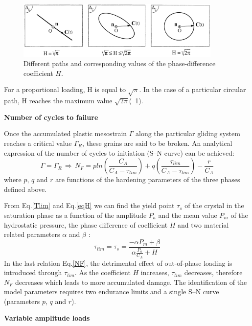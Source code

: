 \documentclass[3p,times,procedia,number]{elsarticle}
\newcommand{\figref}[1]{\figurename~\ref{#1}}
\begin{document}
\begin{figure}[h!]
	\centering
	\includegraphics[width=0.9\textwidth]{figures//H.png} 
	\caption{Different paths and corresponding values of the phase-difference coefficient $H$.}
	\label{figH}
\end{figure}
For a proportional
loading, H is equal to $\sqrt{\pi}$. In the case of a particular
circular path, H reaches the maximum value $\sqrt{2\pi}$(\figref{figH}). 


\textbf{Number of cycles to failure}

Once the accumulated plastic mesostrain $\Gamma$ along the particular gliding
system reaches a critical value $\Gamma_R$, these grains are said
to be broken. An analytical expression of the number
of cycles to initiation (S–N curve) can be achieved:
\begin{equation}
\Gamma=\Gamma_R \, \Rightarrow \, N_F=pln\left(\frac{C_A}{C_A-\tau_{lim}}\right)+q\left(\frac{\tau_{lim}}{C_A-\tau_{lim}}\right)-\frac{r}{C_A}
\label{NF}
\end{equation}
where $p$, $q$ and $r$ are functions of the hardening parameters of the three phases defined above.

From Eq.\eqref{Tlim} and Eq.\eqref{eqH} we can find the yield point $\tau_s$ of the crystal in the saturation phase as a function of the amplitude $P_a$ and the mean value $P_m$ of the hydrostatic pressure, the phase difference of coefficient $H$ and two material related parameters $\alpha$ and $\beta$ :
\begin{equation}
\tau_{lim}=\tau_s=\frac{-\alpha P_m+\beta}{\alpha\frac{P_a}{C_A}+H}
\label{taus}
\end{equation}
In the last relation Eq.\eqref{NF}, the detrimental effect of out-of-phase loading is introduced through $\tau_{lim}$. As the coefficient $H$ increases, $\tau_{lim}$  decreases, therefore $N_F$ decreases which leads to more accumulated damage. The identification of the model parameters requires two endurance limits and a
single S–N curve (parameters $p$, $q$ and $r$).



\textbf{Variable amplitude loads}
\end{document}
